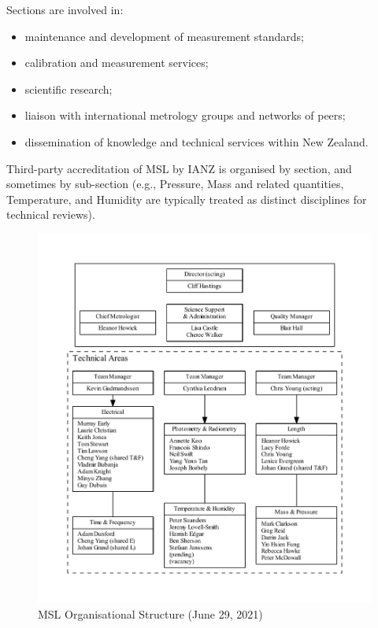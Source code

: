 Sections are involved in:
\begin{itemize}
\item	maintenance and development of measurement standards; 
\item	calibration and measurement services;
\item	scientific research;
\item	liaison with international metrology groups and networks of peers; 
\item	dissemination of knowledge and technical services within New Zealand.
\end{itemize}

Third-party accreditation of MSL by IANZ is organised by section, and sometimes by sub-section (e.g., Pressure, Mass and related quantities, Temperature, and Humidity are typically treated as distinct disciplines for technical reviews).

\begin{figure}
\begin{center}
\includegraphics[width=1.1\textwidth]{pictures/MSL_org_full}
\end{center}
\caption{MSL Organisational Structure (June 29, 2021)}
\label{fig:org_msl}
\end{figure}


